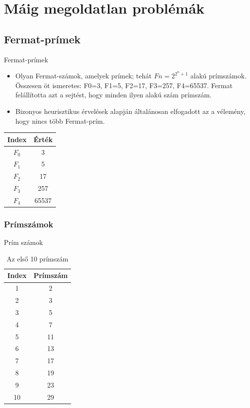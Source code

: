 \documentclass{beamer}
\theoremstyle{definition}
\begin{document}
\section{Máig megoldatlan problémák}
\subsection{Fermat-prímek}
\begin{frame}{Fermat-prímek}
\transsplitverticalin
    \begin{itemize}
        \item[]    Olyan Fermat-számok, amelyek prímek; tehát $Fn=2^{2^n+1}$ alakú prímszámok. Összesen öt ismeretes: F0=3, F1=5, F2=17, F3=257, F4=65537. Fermat felállította azt a sejtést, hogy minden ilyen alakú szám prímszám.
            \pause
        \item[]Bizonyos heurisztikus érvelések alapján általánosan elfogadott az a vélemény, hogy nincs több Fermat-prím.
    \end{itemize}
    \begin{table}[h]
  \centering
  \begin{tabular}{|c|c|}
    \hline
    \textbf{Index} & \textbf{Érték} \\
    \hline
    $F_0$ & 3 \\
    $F_1$ & 5 \\
    $F_2$ & 17 \\
    $F_3$ & 257 \\
    $F_4$ & 65537 \\
    \hline
  \end{tabular}
\end{table}
\end{frame}

\subsubsection{Prímszámok}
\begin{frame}{Prím számok}
\begin{table}[h]
  \centering
  \caption{Az első 10 prímszám}
  \begin{tabular}{|c|c|}
    \hline
    \textbf{Index} & \textbf{Prímszám} \\
    \hline
    1 & 2 \\
    2 & 3 \\
    3 & 5 \\
    4 & 7 \\
    5 & 11 \\
    6 & 13 \\
    7 & 17 \\
    8 & 19 \\
    9 & 23 \\
    10 & 29 \\
    \hline
  \end{tabular}
\end{table}
\end{frame}
\end{document}
